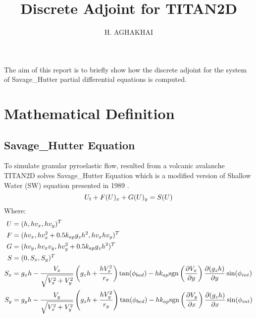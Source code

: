 \documentclass[a4paper,10pt]{article}
\title{Discrete Adjoint for TITAN2D}
\author{H. AGHAKHAI}
\date{}
\begin{document}
\maketitle
% 
% 

The aim of this report is to briefly show how the discrete adjoint for the system of Savage\_Hutter partial differential equations 
is computed. 
\section{Mathematical Definition}
\subsection{Savage\_Hutter Equation}
To simulate granular pyroelastic flow, resulted from a volcanic avalanche TITAN2D solves Savage\_Hutter Equation which is a modified version of Shallow Water (SW) equation presented in 1989 \cite{SavageHutter1989}.
\begin{equation}
 \large{U_t + F(U)_x + G(U)_y = S(U)}
\end{equation}
Where:
\begin{displaymath}
\begin{aligned}
U & = (h, hv_x, hv_y)^T \\
F & = (hv_x, hv_x^2+0.5k_{ap}g_zh^2, hv_xhv_y)^T \\
G & = (hv_y, hv_xv_y, hv_y^2+0.5k_{ap}g_zh^2)^T \\
S & = (0, S_x, S_y)^T \\
S_x & = g_x h  - \frac{V_x}{\sqrt{V_x^2+V_y^2}}\left(g_z h+\frac{hV_x^2}{r_x}\right)\tan(\phi_{bed})
 - h k_{ap}{\rm sgn}\left({\frac{\partial V_x}{\partial y}}\right) \frac{\partial (g_zh)}{\partial y} \sin(\phi_{int})\\
S_y & = g_y h  - \frac{V_y}{\sqrt{V_x^2+V_y^2}}\left(g_z h+\frac{hV_y^2}{r_y}\right)\tan(\phi_{bed})
 - h k_{ap}{\rm sgn}\left({\frac{\partial V_y}{\partial x}}\right) \frac{\partial (g_zh)}{\partial x} \sin(\phi_{int})
\end{aligned}
\end{displaymath}
\end{document}
